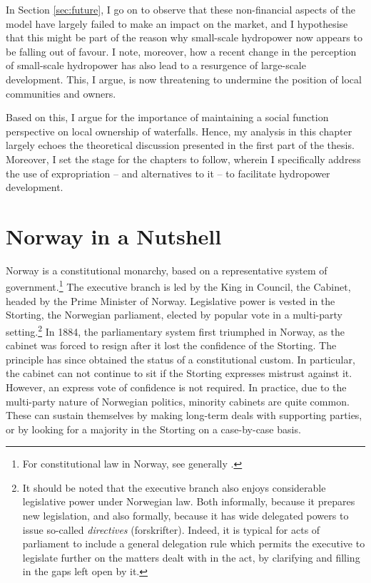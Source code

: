 In Section \ref{sec:future}, I go on to observe that these non-financial aspects of the model have largely failed to make an impact on the market, and I hypothesise that this might be part of the reason why small-scale hydropower now appears to be falling out of favour. I note, moreover, how a recent change in the perception of small-scale hydropower has also lead to a resurgence of large-scale development. This, I argue, is now threatening to undermine the position of local communities and owners.

Based on this, I argue for the importance of maintaining a social function perspective on local ownership of waterfalls. Hence, my analysis in this chapter largely echoes the theoretical discussion presented in the first part of the thesis. Moreover, I set the stage for the chapters to follow, wherein I specifically address the use of expropriation -- and alternatives to it --  to facilitate hydropower development.

\section{Norway in a Nutshell}\label{sec:nutshell}

Norway is a constitutional monarchy, based on a representative system of government.\footnote{For constitutional law in Norway, see generally \cite{andenes06}.} The executive branch is led by the King in Council, the Cabinet, headed by the Prime Minister of Norway. Legislative power is vested in the Storting, the Norwegian parliament, elected by popular vote in a multi-party setting.\footnote{It should be noted that the executive branch also enjoys considerable legislative power under Norwegian law. Both informally, because it prepares new legislation, and also formally, because it has wide delegated powers to issue so-called {\it directives} (forskrifter). Indeed, it is typical for acts of parliament to include a general delegation rule which permits the executive to legislate further on the matters dealt with in the act, by clarifying and filling in the gaps left open by it.} In 1884, the parliamentary system first triumphed in Norway, as the cabinet was forced to resign after it lost the confidence of the Storting. The principle has since obtained the status of a constitutional custom. In particular, the cabinet can not continue to sit if the Storting expresses mistrust against it. However, an express vote of confidence is not required. In practice, due to the multi-party nature of Norwegian politics, minority cabinets are quite common. These can sustain themselves by making long-term deals with supporting parties, or by looking for a majority in the Storting on a case-by-case basis.

